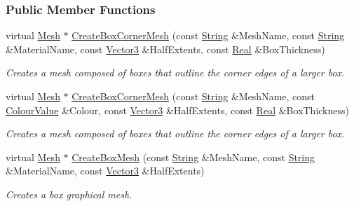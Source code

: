 \subsubsection*{Public Member Functions}
\begin{DoxyCompactItemize}
\item 
virtual \hyperlink{classMezzanine_1_1Mesh}{Mesh} $\ast$ \hyperlink{classMezzanine_1_1MeshManager_a579c2e8547243b3bea9a748c6bcbf28e}{CreateBoxCornerMesh} (const \hyperlink{namespaceMezzanine_acf9fcc130e6ebf08e3d8491aebcf1c86}{String} \&MeshName, const \hyperlink{namespaceMezzanine_acf9fcc130e6ebf08e3d8491aebcf1c86}{String} \&MaterialName, const \hyperlink{classMezzanine_1_1Vector3}{Vector3} \&HalfExtents, const \hyperlink{namespaceMezzanine_a726731b1a7df72bf3583e4a97282c6f6}{Real} \&BoxThickness)
\begin{DoxyCompactList}\small\item\em Creates a mesh composed of boxes that outline the corner edges of a larger box. \item\end{DoxyCompactList}\item 
virtual \hyperlink{classMezzanine_1_1Mesh}{Mesh} $\ast$ \hyperlink{classMezzanine_1_1MeshManager_abf5e8007a2c37a8d79b72de217a57211}{CreateBoxCornerMesh} (const \hyperlink{namespaceMezzanine_acf9fcc130e6ebf08e3d8491aebcf1c86}{String} \&MeshName, const \hyperlink{classMezzanine_1_1ColourValue}{ColourValue} \&Colour, const \hyperlink{classMezzanine_1_1Vector3}{Vector3} \&HalfExtents, const \hyperlink{namespaceMezzanine_a726731b1a7df72bf3583e4a97282c6f6}{Real} \&BoxThickness)
\begin{DoxyCompactList}\small\item\em Creates a mesh composed of boxes that outline the corner edges of a larger box. \item\end{DoxyCompactList}\item 
virtual \hyperlink{classMezzanine_1_1Mesh}{Mesh} $\ast$ \hyperlink{classMezzanine_1_1MeshManager_a5aa5da93359614b3e3a6b8ee955ff4d4}{CreateBoxMesh} (const \hyperlink{namespaceMezzanine_acf9fcc130e6ebf08e3d8491aebcf1c86}{String} \&MeshName, const \hyperlink{namespaceMezzanine_acf9fcc130e6ebf08e3d8491aebcf1c86}{String} \&MaterialName, const \hyperlink{classMezzanine_1_1Vector3}{Vector3} \&HalfExtents)
\begin{DoxyCompactList}\small\item\em Creates a box graphical mesh. \item\end{DoxyCompactList}\item 

\end{DoxyCompactItemize}
